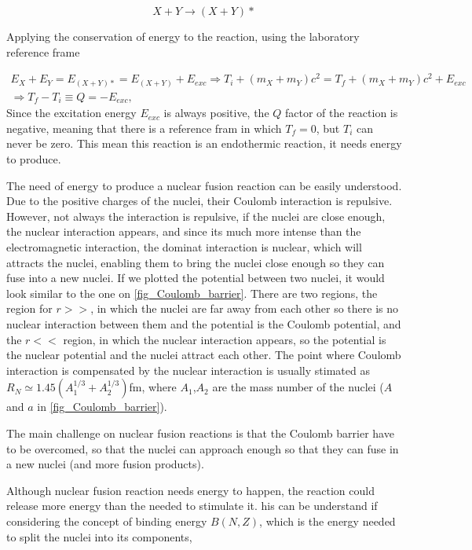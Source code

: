\documentclass[a4paper,12pt,oneside]{book}
\begin{document}
\begin{equation}
X+Y \rightarrow (X+Y)*
\end{equation}

Applying the conservation of energy to the reaction, using the laboratory reference frame

\begin{equation}
	\left.
	\begin{array}{c}
E_X+E_Y=E_{(X+Y)*}=E_{(X+Y)}+E_{exc} \Rightarrow T_i+(m_X+m_Y)c^2=T_f+(m_X+m_Y)c^2 +E_{exc} \\ 
\Rightarrow T_f-T_i \equiv Q =-E_{exc},
\end{array}
\right.
\end{equation}
Since the excitation energy $E_{exc}$ is always positive, the $Q$ factor of the reaction is negative, meaning that there is a reference fram in which $T_f=0$, but $T_i$ can never be zero. This mean this reaction is an endothermic reaction, it needs energy to produce.

The need of energy to produce a nuclear fusion reaction can be easily understood. Due to the positive charges of the nuclei, their Coulomb interaction is repulsive. However, not always the interaction is repulsive, if the nuclei are close enough, the nuclear interaction appears, and since its much more intense than the electromagnetic interaction, the dominat interaction is nuclear, which will attracts the nuclei, enabling them to bring the nuclei close enough so they can fuse into a new nuclei. If we plotted the potential between two nuclei, it would look similar to the one on  \ref{fig_Coulomb_barrier}. There are two regions, the region for $r>>$, in which the nuclei are far away from each other so there is no nuclear interaction between them and the potential is the Coulomb potential, and the $r<<$ region, in which the nuclear interaction appears, so the potential is the nuclear potential and the nuclei attract each other. The point where Coulomb interaction is compensated by the nuclear interaction is usually stimated as $R_N \simeq 1.45 (A_1^{1/3}+A_2^{1/3})$fm, where $A_1$,$A_2$ are the mass number of the nuclei ($A$ and $a$ in \ref{fig_Coulomb_barrier}).


The main challenge on nuclear fusion reactions is that the Coulomb barrier have to be overcomed, so that the nuclei can approach enough so that they can fuse in a new nuclei (and more fusion products).

Although nuclear fusion reaction needs energy to happen, the reaction could release more energy than the needed to stimulate it. his can be understand if considering the concept of binding energy $B(N,Z)$, which is the energy needed to split the nuclei into its components, 
\end{document}
